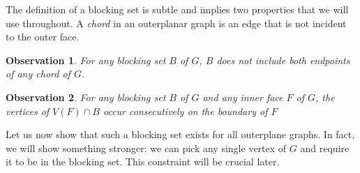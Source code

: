 \documentclass{patmorin}
\newtheorem{obs}{Observation}[theorem]
\begin{document}
The definition of a blocking set is subtle and implies two properties
that
 we will use throughout.
 A \emph{chord} in an outerplanar graph
is an edge that is not incident
 to the outer face.


\begin{obs}
   For any blocking set $B$ of $G$, $B$ does not include both endpoints
   of any chord of $G$.
\end{obs}

\begin{obs}
   For any blocking set $B$ of $G$ and any inner face $F$ of $G$, the
   vertices of $V(F)\cap B$ occur consecutively on the boundary of $F$ 
\end{obs}



Let us now show that such a blocking set exists for all outerplane graphs. In fact, we will show something stronger:  we can pick any single vertex of $G$ and require it to be in the blocking set. This constraint will be crucial later.
\end{document}
